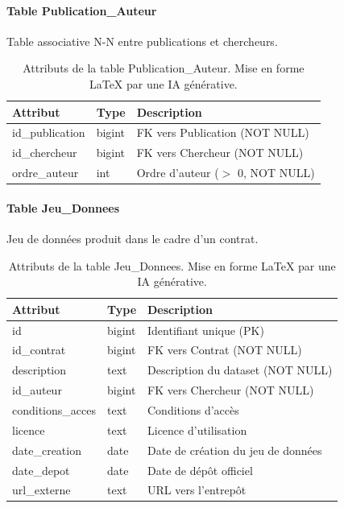 \documentclass[12pt,a4paper]{article}
\begin{document}
\paragraph{Table Publication\_Auteur}
Table associative N-N entre publications et chercheurs.

\begin{table}[H]
\centering
\small
\begin{tabular}{@{}llp{6cm}@{}}
\toprule
\textbf{Attribut} & \textbf{Type} & \textbf{Description} \\ \midrule
id\_publication & bigint & FK vers Publication (NOT NULL) \\
id\_chercheur & bigint & FK vers Chercheur (NOT NULL) \\
ordre\_auteur & int & Ordre d'auteur ($>$ 0, NOT NULL) \\ \bottomrule
\end{tabular}
\caption{Attributs de la table Publication\_Auteur. Mise en forme LaTeX par une IA générative.}
\end{table}

\paragraph{Table Jeu\_Donnees}
Jeu de données produit dans le cadre d'un contrat.

\begin{table}[H]
\centering
\small
\begin{tabular}{@{}llp{5.5cm}@{}}
\toprule
\textbf{Attribut} & \textbf{Type} & \textbf{Description} \\ \midrule
id & bigint & Identifiant unique (PK) \\
id\_contrat & bigint & FK vers Contrat (NOT NULL) \\
description & text & Description du dataset (NOT NULL) \\
id\_auteur & bigint & FK vers Chercheur (NOT NULL) \\
conditions\_acces & text & Conditions d'accès \\
licence & text & Licence d'utilisation \\
date\_creation & date & Date de création du jeu de données \\
date\_depot & date & Date de dépôt officiel \\
url\_externe & text & URL vers l'entrepôt \\ \bottomrule
\end{tabular}
\caption{Attributs de la table Jeu\_Donnees. Mise en forme LaTeX par une IA générative.}
\end{table}
\end{document}
